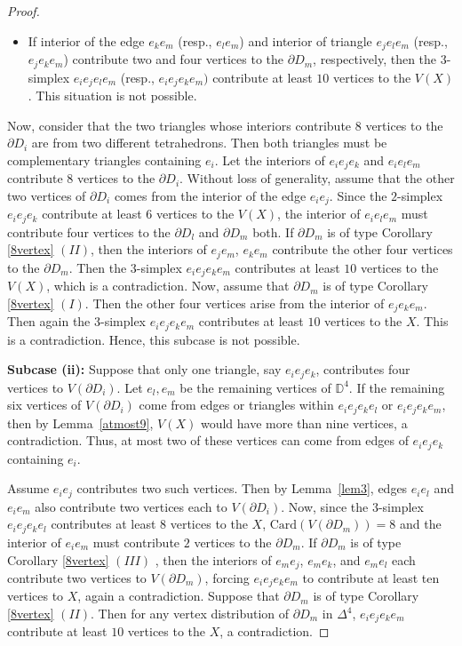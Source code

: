 \documentclass[10pt,a4paper]{amsart}
\newcommand{\D}{\Delta}
\begin{document}
\begin{proof}
\begin{itemize}
\item If interior of the edge $e_ke_m$ (resp., $e_le_m$) and interior of triangle $e_je_le_m$ (resp., $e_je_ke_m$) contribute two and four vertices to the $\partial D_m$, respectively, then the $3$-simplex $e_ie_je_le_m$ (resp., $e_ie_je_ke_m)$ contribute at least $10$ vertices to the $V(X)$. This situation is not possible.

 
\end{itemize}

Now, consider that the two triangles whose interiors contribute $8$ vertices to the $\partial D_i$ are from two different tetrahedrons. Then both triangles must be complementary triangles containing $e_i$. Let the interiors of $e_ie_je_k$ and $e_ie_le_m$ contribute $8$ vertices to the $\partial D_i$. Without loss of generality, assume that the other two vertices of $\partial D_i$ comes from the interior of the edge $e_ie_j$. 
Since the $2$-simplex $e_ie_je_k$ contribute at least $6$ vertices to the $V(X)$, the  interior of $e_ie_le_m$ must contribute four vertices to the $\partial D_l$ and $\partial D_m$ both. If $\partial D_m$ is of type Corollary \ref{8vertex} $(II)$, then the interiors of $e_je_m$, $e_ke_m$ contribute the other four vertices to the $\partial D_m$. Then the $3$-simplex $e_ie_je_ke_m$ contributes at least $10$ vertices to the $V(X)$, which is a contradiction. Now, assume that $\partial D_m$ is of type Corollary \ref{8vertex} $(I)$. Then the other four vertices arise from the interior of $e_je_ke_m$. Then again the $3$-simplex $e_ie_je_ke_m$ contributes at least $10$ vertices to the $X$. This is a contradiction. Hence, this subcase is not possible.

\textbf{Subcase (ii):} Suppose that only one triangle, say $e_i e_j e_k$, contributes four vertices to $V(\partial D_i)$.  
Let $e_l, e_m$ be the remaining vertices of $\mathbb{D}^4$.  
If the remaining six vertices of $V(\partial D_i)$ come from edges or triangles within $e_i e_j e_k e_l$ or $e_i e_j e_k e_m$, then by Lemma~\ref{atmost9}, $V(X)$ would have more than nine vertices, a contradiction.  
Thus, at most two of these vertices can come from edges of $e_ie_je_k$ containing $e_i$.

Assume $e_i e_j$ contributes two such vertices.  
Then by Lemma~\ref{lem3}, edges $e_ie_l$ and $e_ie_m$ also contribute two vertices each to $V(\partial D_i)$. Now, since the $3$-simplex $e_ie_je_ke_l$ contributes at least $8$ vertices to the $X$, $\mathrm{Card}(V(\partial D_m)) = 8$ and the interior of $e_ie_m$ must contribute $2$ vertices to the $\partial D_m$.   
If $\partial D_m$ is of type Corollary \ref{8vertex} $(III)$ , then the interiors of $e_m e_j$, $e_m e_k$, and $e_m e_l$ each contribute two vertices to $V(\partial D_m)$, forcing $e_i e_j e_k e_m$ to contribute at least  ten vertices to $X$, again a contradiction.  
Suppose that $\partial D_m$ is of type Corollary \ref{8vertex} $(II)$. Then for any vertex distribution of $\partial D_m$ in $\D^4$, $e_ie_je_ke_m$ contribute at least $10$ vertices to the $X$, a contradiction.





\end{proof}
\end{document}
